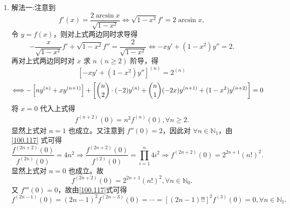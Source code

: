 \documentclass[../../main.tex]{subfiles}
\begin{document}
\begin{solution}
\begin{enumerate}[(1)]
\item {\color{blue}解法一:}注意到
\[
f'(x) = \frac{2\arcsin x}{\sqrt{1 - x^2}} \Longleftrightarrow \sqrt{1 - x^2} f' = 2\arcsin x,
\]
令 \( y = f(x) \)，则对上式两边同时求导得
\[
-\frac{x}{\sqrt{1 - x^2}} f' + \sqrt{1 - x^2} f'' = \frac{2}{\sqrt{1 - x^2}} \Longleftrightarrow -x y' + (1 - x^2) y'' = 2.
\]
再对上式两边同时对 \( x \) 求 \( n \ (n \geqslant 2) \) 阶导，得
\[
\left[ -x y' + (1 - x^2) y'' \right]^{(n)} = 2^{(n)}
\]
\[
\Longleftrightarrow -\left[ n y^{(n)} + x y^{(n + 1)} \right] + \left[ \dbinom{n}{2} \cdot (-2) y^{(n)} + \dbinom{n}{1} (-2x) y^{(n + 1)} + (1 - x^2) y^{(n + 2)} \right] = 0
\]
将 \( x = 0 \) 代入上式得
\begin{align}\label{100.117}
f^{(n + 2)}(0) = n^2 f^{(n)}(0), \forall n \geqslant 2. 
\end{align}
显然上式对 \( n = 1 \) 也成立。又注意到 \( f''(0) = 2 \)，因此对 \( \forall n \in \mathbb{N}_1 \)，由\eqref{100.117} 式可得
\[
\frac{f^{(2n + 2)}(0)}{f^{(2n)}(0)} = 4n^2 \Rightarrow \frac{f^{(2n + 2)}(0)}{f^{(2)}(0)} = \prod_{i = 1}^n 4i^2 \Rightarrow f^{(2n + 2)}(0) = 2^{2n + 1} (n!)^2.
\]
显然上式对 \( n = 0 \) 也成立。故
\[
f^{(2n + 2)}(0) = 2^{2n + 1} (n!)^2, \forall n \in \mathbb{N}_0.
\]
又 \( f'''(0) = 0 \)，故由\eqref{100.117}式可得
\[
f^{(2n - 1)}(0) = (2n - 1)^2 f^{(2n - 3)}(0) = \cdots = \left[ (2n - 1)!! \right]^2 f^{(3)}(0) = 0, \forall n \in \mathbb{N}_1.
\]


\end{enumerate}
\end{solution}
\end{document}
